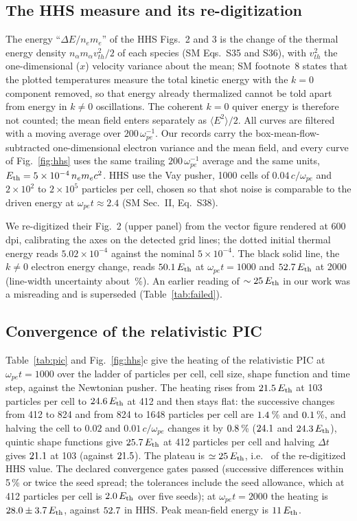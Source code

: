 \documentclass[aps,pre,reprint,floatfix,amsmath,amssymb,nofootinbib,superscriptaddress]{revtex4-2}
\newcommand{\wpe}{\omega_{pe}}
\begin{document}
\subsection{The HHS measure and its re-digitization}
The energy ``$\Delta E/n_em_e$'' of the HHS Figs.~2 and 3 is the change of the thermal energy density $n_\alpha m_\alpha v_{th}^2/2$ of each species (SM Eqs.~S35 and S36), with $v_{th}^2$ the one-dimensional ($x$) velocity variance about the mean; SM footnote~8 states that the plotted temperatures measure the total kinetic energy with the $k=0$ component removed, so that energy already thermalized cannot be told apart from energy in $k\ne0$ oscillations. The coherent $k=0$ quiver energy is therefore not counted; the mean field enters separately as $\langle E^2\rangle/2$. All curves are filtered with a moving average over $200\,\wpe^{-1}$. Our records carry the box-mean-flow-subtracted one-dimensional electron variance and the mean field, and every curve of Fig.~\ref{fig:hhs} uses the same trailing $200\,\wpe^{-1}$ average and the same units, $E_{\rm th}=5\times10^{-4}\,n_em_ec^2$. HHS use the Vay pusher, 1000 cells of $0.04\,c/\wpe$ and $2\times10^2$ to $2\times10^5$ particles per cell, chosen so that shot noise is comparable to the driven energy at $\wpe t\approx2.4$ (SM Sec.~II, Eq.~S38).

We re-digitized their Fig.~2 (upper panel) from the vector figure rendered at 600 dpi, calibrating the axes on the detected grid lines; the dotted initial thermal energy reads $5.02\times10^{-4}$ against the nominal $5\times10^{-4}$. The black solid line, the $k\ne0$ electron energy change, reads $50.1\,E_{\rm th}$ at $\wpe t=1000$ and $52.7\,E_{\rm th}$ at 2000 (line-width uncertainty about \hhsDigRel\,\%). An earlier reading of $\sim25\,E_{\rm th}$ in our work was a misreading and is superseded (Table~\ref{tab:failed}).

\subsection{Convergence of the relativistic PIC}
Table~\ref{tab:pic} and Fig.~\ref{fig:hhs}c give the heating of the relativistic PIC at $\wpe t=1000$ over the ladder of particles per cell, cell size, shape function and time step, against the Newtonian pusher. The heating rises from $21.5\,E_{\rm th}$ at 103 particles per cell to $24.6\,E_{\rm th}$ at 412 and then stays flat: the successive changes from 412 to 824 and from 824 to 1648 particles per cell are $1.4$\,\% and $0.1$\,\%, and halving the cell to $0.02$ and $0.01\,c/\wpe$ changes it by $0.8$\,\% ($24.1$ and $24.3\,E_{\rm th}$), quintic shape functions give $25.7\,E_{\rm th}$ at 412 particles per cell and halving $\Delta t$ gives $21.1$ at 103 (against $21.5$). The plateau is $\simeq25\,E_{\rm th}$, i.e. \pcPlatHHS\ of the re-digitized HHS value. The declared convergence gates passed (successive differences within 5\,\% or twice the seed spread; the tolerances include the seed allowance, which at 412 particles per cell is $2.0\,E_{\rm th}$ over five seeds); at $\wpe t=2000$ the heating is $28.0\pm3.7\,E_{\rm th}$, against $52.7$ in HHS. Peak mean-field energy is $11\,E_{\rm th}$.
\end{document}
